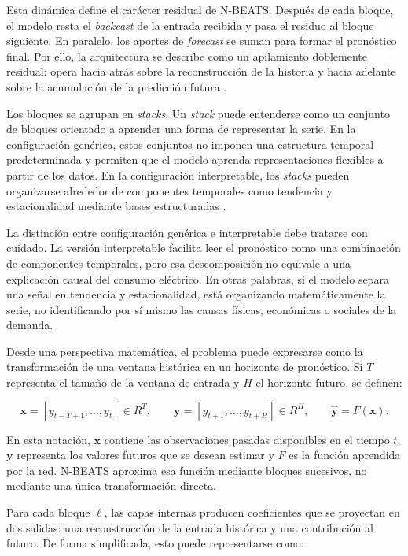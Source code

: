 Esta dinámica define el carácter residual de N-BEATS. Después de cada bloque, el modelo resta el \emph{backcast} de la entrada recibida y pasa el residuo al bloque siguiente. En paralelo, los aportes de \emph{forecast} se suman para formar el pronóstico final. Por ello, la arquitectura se describe como un apilamiento doblemente residual: opera hacia atrás sobre la reconstrucción de la historia y hacia adelante sobre la acumulación de la predicción futura \parencite{oreshkin2020}.

Los bloques se agrupan en \emph{stacks}. Un \emph{stack} puede entenderse como un conjunto de bloques orientado a aprender una forma de representar la serie. En la configuración genérica, estos conjuntos no imponen una estructura temporal predeterminada y permiten que el modelo aprenda representaciones flexibles a partir de los datos. En la configuración interpretable, los \emph{stacks} pueden organizarse alrededor de componentes temporales como tendencia y estacionalidad mediante bases estructuradas \parencite{oreshkin2020}.

La distinción entre configuración genérica e interpretable debe tratarse con cuidado. La versión interpretable facilita leer el pronóstico como una combinación de componentes temporales, pero esa descomposición no equivale a una explicación causal del consumo eléctrico. En otras palabras, si el modelo separa una señal en tendencia y estacionalidad, está organizando matemáticamente la serie, no identificando por sí mismo las causas físicas, económicas o sociales de la demanda.

Desde una perspectiva matemática, el problema puede expresarse como la transformación de una ventana histórica en un horizonte de pronóstico. Si $T$ representa el tamaño de la ventana de entrada y $H$ el horizonte futuro, se definen:

\[
    \mathbf{x} = [y_{t-T+1}, \ldots, y_t] \in R^{T},
    \qquad
    \mathbf{y} = [y_{t+1}, \ldots, y_{t+H}] \in R^{H},
    \qquad
    \hat{\mathbf{y}} = F(\mathbf{x}).
\]

En esta notación, $\mathbf{x}$ contiene las observaciones pasadas disponibles en el tiempo $t$, $\mathbf{y}$ representa los valores futuros que se desean estimar y $F$ es la función aprendida por la red. N-BEATS aproxima esa función mediante bloques sucesivos, no mediante una única transformación directa.

Para cada bloque $\ell$, las capas internas producen coeficientes que se proyectan en dos salidas: una reconstrucción de la entrada histórica y una contribución al futuro. De forma simplificada, esto puede representarse como:

